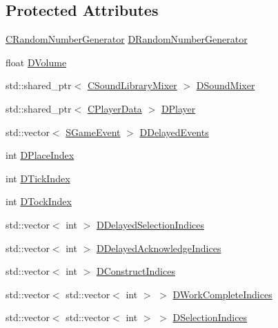 \subsection*{Protected Attributes}
\begin{DoxyCompactItemize}
\item 
\hyperlink{classCRandomNumberGenerator}{C\+Random\+Number\+Generator} \hyperlink{classCSoundEventRenderer_a591b9430a0f6a70259f87a2467de908f}{D\+Random\+Number\+Generator}
\item 
float \hyperlink{classCSoundEventRenderer_a3812aeb93aef90635a7da72fc101c686}{D\+Volume}
\item 
std\+::shared\+\_\+ptr$<$ \hyperlink{classCSoundLibraryMixer}{C\+Sound\+Library\+Mixer} $>$ \hyperlink{classCSoundEventRenderer_a5abf598a7e8783d9cc78e0d33a65c9c2}{D\+Sound\+Mixer}
\item 
std\+::shared\+\_\+ptr$<$ \hyperlink{classCPlayerData}{C\+Player\+Data} $>$ \hyperlink{classCSoundEventRenderer_ad98889d7f52477a2e148d7e390641d51}{D\+Player}
\item 
std\+::vector$<$ \hyperlink{structSGameEvent}{S\+Game\+Event} $>$ \hyperlink{classCSoundEventRenderer_a896d5c4717b407fdb6567aed87da3e50}{D\+Delayed\+Events}
\item 
int \hyperlink{classCSoundEventRenderer_a0ca919430ff2fb57324c0ee712c5b7b1}{D\+Place\+Index}
\item 
int \hyperlink{classCSoundEventRenderer_a810ef7feb31ba13f89919ed78d0cee25}{D\+Tick\+Index}
\item 
int \hyperlink{classCSoundEventRenderer_a93c4c050a9840199ab026018c107e62c}{D\+Tock\+Index}
\item 
std\+::vector$<$ int $>$ \hyperlink{classCSoundEventRenderer_ab2103a634f4ba6d12824ecddf6693870}{D\+Delayed\+Selection\+Indices}
\item 
std\+::vector$<$ int $>$ \hyperlink{classCSoundEventRenderer_a8e36efd07e98242ea3a80564c595e397}{D\+Delayed\+Acknowledge\+Indices}
\item 
std\+::vector$<$ int $>$ \hyperlink{classCSoundEventRenderer_ad49edcbf2abf0ecef518c843475098e2}{D\+Construct\+Indices}
\item 
std\+::vector$<$ std\+::vector$<$ int $>$ $>$ \hyperlink{classCSoundEventRenderer_a59a26b4062659921cfb24d7f76253938}{D\+Work\+Complete\+Indices}
\item 
std\+::vector$<$ std\+::vector$<$ int $>$ $>$ \hyperlink{classCSoundEventRenderer_afda3dfc8fa16264d91bc56a4bb1d150c}{D\+Selection\+Indices}
\item 

\end{DoxyCompactItemize}
